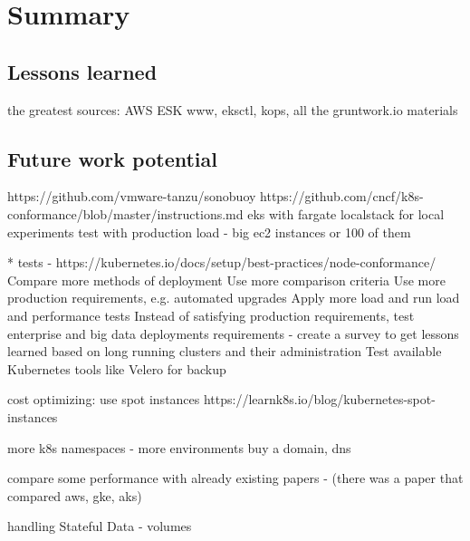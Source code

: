 \section{Summary}
\subsection{Lessons learned}

the greatest sources: AWS ESK www, eksctl, kops, all the gruntwork.io materials

\subsection{Future work potential}
https://github.com/vmware-tanzu/sonobuoy
https://github.com/cncf/k8s-conformance/blob/master/instructions.md
eks with fargate
localstack for local experiments
test with production load - big ec2 instances or 100 of them

* tests - https://kubernetes.io/docs/setup/best-practices/node-conformance/
Compare more methods of deployment
Use more comparison criteria
Use more production requirements, e.g. automated upgrades
Apply more load and run load and performance tests
Instead of satisfying production requirements, test enterprise and big data deployments requirements - create a survey to get lessons learned based on long running clusters and their administration
Test available Kubernetes tools like Velero for backup

cost optimizing: use spot instances https://learnk8s.io/blog/kubernetes-spot-instances

more k8s namespaces - more environments
buy a domain, dns

compare some performance with already existing papers - (there was a paper that compared aws, gke, aks)

handling Stateful Data - volumes
